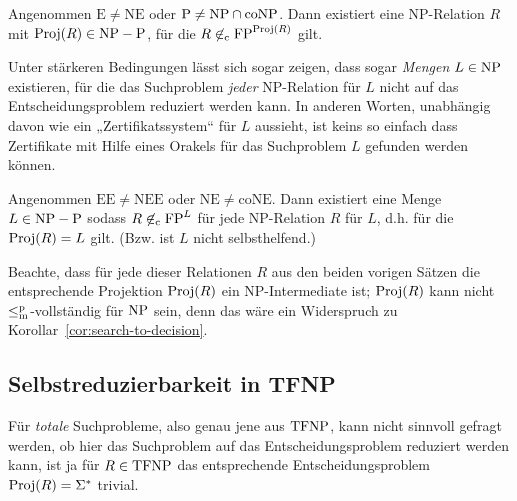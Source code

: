 \begin{theorem}\label{thm:impagliazzo-search}
    Angenommen $\mathrm{E\neq NE}$ oder $\mathrm{P}\neq \mathrm{NP}\cap\mathrm{coNP}$. Dann existiert eine NP-Relation $R$ mit $\operatorname{Proj}(R)\in \mathrm{NP}-\mathrm{P}$, für die $R\not\in_\mathrm c\mathrm{FP}^{\operatorname{Proj}(R)}$ gilt.
\end{theorem}

Unter stärkeren Bedingungen lässt sich sogar zeigen, dass sogar \emph{Mengen} $L\in\mathrm{NP}$ existieren, für die das Suchproblem \emph{jeder} NP-Relation für $L$ nicht auf das Entscheidungsproblem reduziert werden kann. In anderen Worten, unabhängig davon wie ein „Zertifikatssystem“ für $L$ aussieht, ist keins so einfach dass Zertifikate mit Hilfe eines Orakels für das Suchproblem $L$ gefunden werden können.

\begin{theorem}
Angenommen $\mathrm{EE\neq NEE}$ oder $\mathrm{NE\neq coNE}$. Dann existiert eine Menge $L\in\mathrm{NP}-\mathrm{P}$ sodass $R\not\in_\mathrm c \mathrm{FP}^L$ für jede NP-Relation $R$ für $L$, d.h. für die $\operatorname{Proj}(R)=L$ gilt. (Bzw. ist $L$ nicht selbsthelfend.)
\end{theorem}
Beachte, dass für jede dieser Relationen $R$ aus den beiden vorigen Sätzen die entsprechende Projektion $\operatorname{Proj}(R)$ ein NP-Intermediate ist; $\operatorname{Proj}(R)$ kann nicht $\leq_\mathrm{m}^\mathrm{p}$-vollständig für $\mathrm{NP}$ sein, denn das wäre ein Widerspruch zu Korollar~\ref{cor:search-to-decision}.


\subsection*{Selbstreduzierbarkeit in TFNP}

Für \emph{totale} Suchprobleme, also genau jene aus $\mathrm{TFNP}$, kann nicht sinnvoll gefragt werden, ob hier das Suchproblem auf das Entscheidungsproblem reduziert werden kann, ist ja für $R\in\mathrm{TFNP}$ das entsprechende Entscheidungsproblem $\operatorname{Proj}(R)=\Sigma^*$ trivial.

